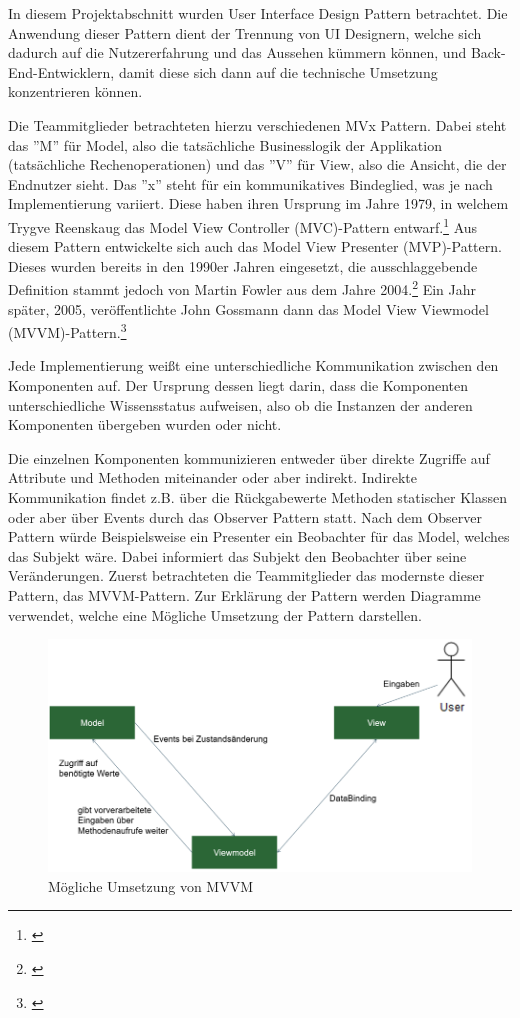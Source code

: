 In diesem Projektabschnitt wurden User Interface Design Pattern betrachtet. Die Anwendung dieser Pattern dient der Trennung von UI Designern, welche sich dadurch auf die Nutzererfahrung und das Aussehen kümmern können, und Back-End-Entwicklern, damit diese sich dann auf die technische Umsetzung konzentrieren können. 

Die Teammitglieder betrachteten hierzu verschiedenen MVx Pattern. Dabei steht das ''M'' für Model, also die tatsächliche Businesslogik der Applikation (tatsächliche Rechenoperationen) und das ''V'' für View, also die Ansicht, die der Endnutzer sieht. Das ''x'' steht für ein kommunikatives Bindeglied, was je nach Implementierung variiert. Diese haben ihren Ursprung im Jahre 1979, in welchem Trygve Reenskaug das Model View Controller (MVC)-Pattern entwarf.\footnote{\cite[vgl.][]{c2MVC}} Aus diesem Pattern entwickelte sich auch das Model View Presenter (MVP)-Pattern. Dieses wurden bereits in den 1990er Jahren eingesetzt, die ausschlaggebende Definition stammt jedoch von Martin Fowler aus dem Jahre 2004.\footnote{\cite[vgl.][]{FowlerMVP}} Ein Jahr später, 2005, veröffentlichte John Gossmann dann das Model View Viewmodel (MVVM)-Pattern.\footnote{\cite[vgl.][]{HeiseMVVM}}

Jede Implementierung weißt eine unterschiedliche Kommunikation zwischen den Komponenten auf. Der Ursprung dessen liegt darin, dass die Komponenten unterschiedliche Wissensstatus aufweisen, also ob die Instanzen der anderen Komponenten übergeben wurden oder nicht. 

Die einzelnen Komponenten kommunizieren entweder über direkte Zugriffe auf Attribute und Methoden miteinander oder aber indirekt. Indirekte Kommunikation findet z.B. über die Rückgabewerte Methoden statischer Klassen oder aber über Events durch das Observer Pattern statt. Nach dem Observer Pattern würde Beispielsweise ein Presenter ein Beobachter für das Model, welches das Subjekt wäre. Dabei informiert das Subjekt den Beobachter über seine Veränderungen. 
Zuerst betrachteten die Teammitglieder das modernste dieser Pattern, das MVVM-Pattern. Zur Erklärung der Pattern werden Diagramme verwendet, welche eine Mögliche Umsetzung der Pattern darstellen.


\begin{figure}[!h]
	\includegraphics[width=1\columnwidth]{img/design-pattern-mvvm}
	\caption[Mögliche Umsetzung von MVVM ]{Mögliche Umsetzung von MVVM\footnotemark}
\end{figure}


